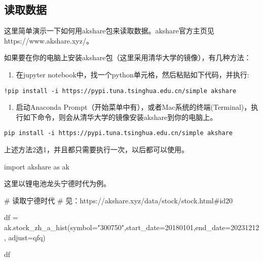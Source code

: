 \documentclass[
  letterpaper,
  DIV=11,
  numbers=noendperiod]{scrreprt}
\newenvironment{Shaded}{\begin{snugshade}}{\end{snugshade}}
\newcommand{\CommentTok}[1]{\textcolor[rgb]{0.37,0.37,0.37}{#1}}
\newcommand{\ImportTok}[1]{\textcolor[rgb]{0.00,0.46,0.62}{#1}}
\newcommand{\NormalTok}[1]{\textcolor[rgb]{0.00,0.23,0.31}{#1}}
\newcommand{\OperatorTok}[1]{\textcolor[rgb]{0.37,0.37,0.37}{#1}}
\newcommand{\StringTok}[1]{\textcolor[rgb]{0.13,0.47,0.30}{#1}}
\providecommand{\tightlist}{%
  \setlength{\itemsep}{0pt}\setlength{\parskip}{0pt}}\usepackage{longtable,booktabs,array}
\begin{document}
\hypertarget{ux8bfbux53d6ux6570ux636e-2}{%
\subsection{读取数据}\label{ux8bfbux53d6ux6570ux636e-2}}

这里简单演示一下如何用akshare包来读取数据。akshare官方主页见https://www.akshare.xyz/。

如果要在你的电脑上安装akshare包（这里采用清华大学的镜像），有几种方法：

\begin{enumerate}
\def\labelenumi{\arabic{enumi}.}
\tightlist
\item
  在jupyter notebook中，找一个python单元格，然后粘贴如下代码，并执行:
\end{enumerate}

\begin{verbatim}
!pip install -i https://pypi.tuna.tsinghua.edu.cn/simple akshare
\end{verbatim}

\begin{enumerate}
\def\labelenumi{\arabic{enumi}.}
\setcounter{enumi}{1}
\tightlist
\item
  启动Anaconda
  Prompt（开始菜单中有），或者Mac系统的终端(Terminal)，执行如下命令，则会从清华大学的镜像安装akshare到你的电脑上。
\end{enumerate}

\begin{verbatim}
pip install -i https://pypi.tuna.tsinghua.edu.cn/simple akshare
\end{verbatim}

上述方法2选1，并且都只需要执行一次，以后都可以使用。

\begin{Shaded}
\begin{Highlighting}[]
\ImportTok{import}\NormalTok{ akshare }\ImportTok{as}\NormalTok{ ak}
\end{Highlighting}
\end{Shaded}

这里以锂电池龙头宁德时代为例。

\begin{Shaded}
\begin{Highlighting}[]
\CommentTok{\# 读取宁德时代}
\CommentTok{\# 见：https://akshare.xyz/data/stock/stock.html\#id20}

\NormalTok{df }\OperatorTok{=}\NormalTok{ ak.stock\_zh\_a\_hist(symbol}\OperatorTok{=}\StringTok{"300750"}\NormalTok{,start\_date}\OperatorTok{=}\StringTok{\textquotesingle{}20180101\textquotesingle{}}\NormalTok{,end\_date}\OperatorTok{=}\StringTok{\textquotesingle{}20231212\textquotesingle{}}\NormalTok{, adjust}\OperatorTok{=}\StringTok{\textquotesingle{}qfq\textquotesingle{}}\NormalTok{)}

\NormalTok{df}
\end{Highlighting}
\end{Shaded}
\end{document}
